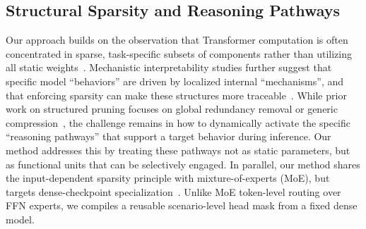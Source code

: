 \subsection{Structural Sparsity and Reasoning Pathways}
\vspace{-1mm}
Our approach builds on the observation that Transformer computation is often concentrated in sparse, task-specific subsets of components rather than utilizing all static weights~\cite{michel2019sixteen,voita2019heads}. Mechanistic interpretability studies further suggest that specific model ``behaviors'' are driven by localized internal ``mechanisms'', and that enforcing sparsity can make these structures more traceable~\cite{elhage2021framework,openai2025sparsecircuitsblog}. While prior work on structured pruning focuses on global redundancy removal or generic compression~\cite{frantar2023sparsegpt}, the challenge remains in how to dynamically activate the specific ``reasoning pathways'' that support a target behavior during inference. Our method addresses this by treating these pathways not as static parameters, but as functional units that can be selectively engaged.
In parallel, our method shares the input-dependent sparsity principle with mixture-of-experts (MoE), but targets dense-checkpoint specialization~\citep{shazeer2017outrageously,lepikhin2020gshard,fedus2022switch,jiang2024mixtral}. Unlike MoE token-level routing over FFN experts, we compiles a reusable scenario-level head mask from a fixed dense model.
\vspace{-0.5mm}

